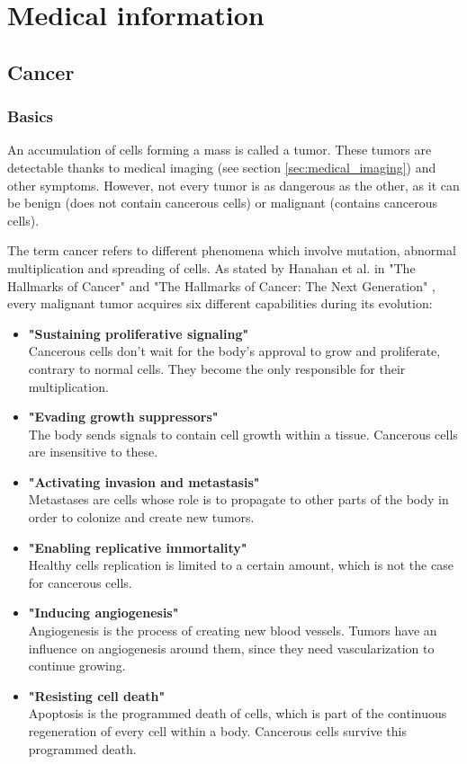 
\chapter{Medical information}
\label{ch:medical}

\section{Cancer}


\subsection{Basics}
An accumulation of cells forming a mass is called a tumor. These tumors are detectable thanks to medical imaging (see section \ref{sec:medical_imaging}) and other symptoms. However, not every tumor is as dangerous as the other, as it can be benign (does not contain cancerous cells) or malignant (contains cancerous cells).

The term cancer refers to different phenomena which involve mutation, abnormal multiplication and spreading of cells. As stated by Hanahan et al. in "The Hallmarks of Cancer" \cite{19} and "The Hallmarks of Cancer: The Next Generation" \cite{20}, every malignant tumor acquires six different capabilities during its evolution: 
\begin{itemize}
	\item \textbf{"Sustaining proliferative signaling"}\\ Cancerous cells don't wait for the body's approval to grow and proliferate, contrary to normal cells. They become the only responsible for their multiplication.
	\item \textbf{"Evading growth suppressors"}\\
The body sends signals to contain cell growth within a tissue. Cancerous cells are insensitive to these. 
	\item \textbf{"Activating invasion and metastasis"}\\
Metastases are cells whose role is to propagate to other parts of the body in order to colonize and create new tumors. 
	\item \textbf{"Enabling replicative immortality"}\\
Healthy cells replication is limited to a certain amount, which is not the case for cancerous cells. 
	\item \textbf{"Inducing angiogenesis"}
\\Angiogenesis is the process of creating new blood vessels. Tumors have an influence on angiogenesis around them, since they need vascularization to continue growing. 
	\item \textbf{"Resisting cell death"}
\\Apoptosis is the programmed death of cells, which is part of the continuous regeneration of every cell within a body. Cancerous cells survive this programmed death. 
	
\end{itemize}


